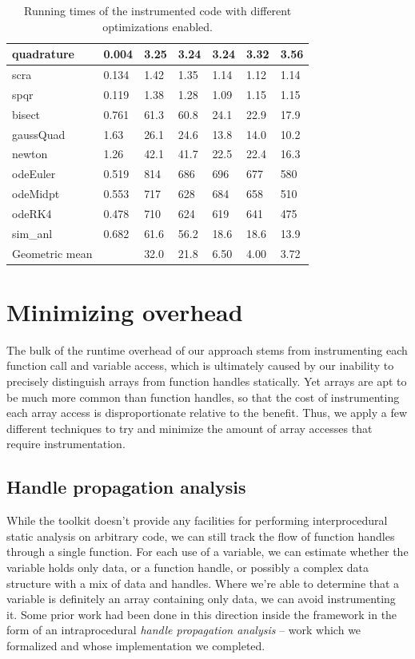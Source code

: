 \begin{table}
\begin{tabular}{| l || l || l | l | l | l | l |}
  quadrature  & 0.004 & 3.25 & 3.24 & 3.24 & 3.32 & 3.56    \\ \hline
  scra        & 0.134 & 1.42 & 1.35 & 1.14 & 1.12 & 1.14    \\ \hline
  spqr        & 0.119 & 1.38 & 1.28 & 1.09 & 1.15 & 1.15    \\ \hhline{|=||=||=|=|=|=|=|}
  bisect      & 0.761 & 61.3 & 60.8 & 24.1 & 22.9 & 17.9    \\ \hline
  gaussQuad   & 1.63  & 26.1 & 24.6 & 13.8 & 14.0 & 10.2    \\ \hline
  newton      & 1.26  & 42.1 & 41.7 & 22.5 & 22.4 & 16.3    \\ \hline
  odeEuler    & 0.519 & 814  & 686  & 696  & 677  & 580     \\ \hline
  odeMidpt    & 0.553 & 717  & 628  & 684  & 658  & 510     \\ \hline
  odeRK4      & 0.478 & 710  & 624  & 619  & 641  & 475     \\ \hline
  sim\_anl    & 0.682 & 61.6 & 56.2 & 18.6 & 18.6 & 13.9    \\ \hhline{|=||=||=|=|=|=|=|}
  Geometric mean & & 32.0 & 21.8 & 6.50 & 4.00 & 3.72 \\ \hline
\end{tabular}
\caption{Running times of the instrumented code with different optimizations
enabled.}
\label{tab:InstrumentationResults}
\end{table}

\section{Minimizing overhead}

The bulk of the runtime overhead of our approach stems from instrumenting each
function call and variable access, which is ultimately caused by our inability
to precisely distinguish arrays from function handles statically. Yet arrays
are apt to be much more common than function handles, so that the cost of
instrumenting each array access is disproportionate relative to the benefit.
Thus, we apply a few different techniques to try and minimize the amount of
array accesses that require instrumentation.

\subsection{Handle propagation analysis}

While the \mclab toolkit doesn't provide any facilities for performing
interprocedural static analysis on arbitrary \matlab code, we can still track
the flow of function handles through a single function. For each use of a
variable, we can estimate whether the variable holds only data, or a function
handle, or possibly a complex data structure with a mix of data and handles.
Where we're able to determine that a variable is definitely an array containing
only data, we can avoid instrumenting it. Some prior work had been done in this
direction inside the \mclab framework in the form of an intraprocedural
\emph{handle propagation analysis} -- work which we formalized and whose
implementation we completed.

